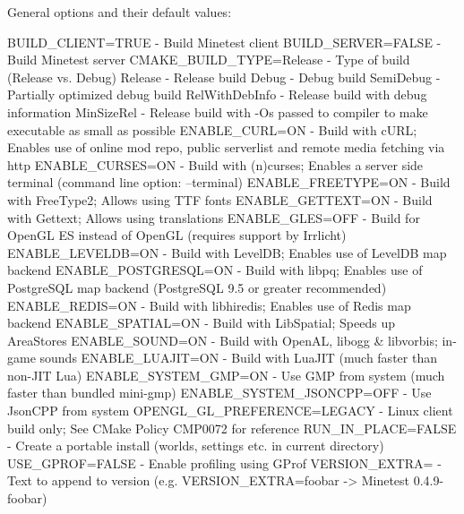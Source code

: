 General options and their default values\+: \begin{DoxyVerb}BUILD_CLIENT=TRUE          - Build Minetest client
BUILD_SERVER=FALSE         - Build Minetest server
CMAKE_BUILD_TYPE=Release   - Type of build (Release vs. Debug)
    Release                - Release build
    Debug                  - Debug build
    SemiDebug              - Partially optimized debug build
    RelWithDebInfo         - Release build with debug information
    MinSizeRel             - Release build with -Os passed to compiler to make executable as small as possible
ENABLE_CURL=ON             - Build with cURL; Enables use of online mod repo, public serverlist and remote media fetching via http
ENABLE_CURSES=ON           - Build with (n)curses; Enables a server side terminal (command line option: --terminal)
ENABLE_FREETYPE=ON         - Build with FreeType2; Allows using TTF fonts
ENABLE_GETTEXT=ON          - Build with Gettext; Allows using translations
ENABLE_GLES=OFF            - Build for OpenGL ES instead of OpenGL (requires support by Irrlicht)
ENABLE_LEVELDB=ON          - Build with LevelDB; Enables use of LevelDB map backend
ENABLE_POSTGRESQL=ON       - Build with libpq; Enables use of PostgreSQL map backend (PostgreSQL 9.5 or greater recommended)
ENABLE_REDIS=ON            - Build with libhiredis; Enables use of Redis map backend
ENABLE_SPATIAL=ON          - Build with LibSpatial; Speeds up AreaStores
ENABLE_SOUND=ON            - Build with OpenAL, libogg & libvorbis; in-game sounds
ENABLE_LUAJIT=ON           - Build with LuaJIT (much faster than non-JIT Lua)
ENABLE_SYSTEM_GMP=ON       - Use GMP from system (much faster than bundled mini-gmp)
ENABLE_SYSTEM_JSONCPP=OFF  - Use JsonCPP from system
OPENGL_GL_PREFERENCE=LEGACY - Linux client build only; See CMake Policy CMP0072 for reference
RUN_IN_PLACE=FALSE         - Create a portable install (worlds, settings etc. in current directory)
USE_GPROF=FALSE            - Enable profiling using GProf
VERSION_EXTRA=             - Text to append to version (e.g. VERSION_EXTRA=foobar -> Minetest 0.4.9-foobar)
\end{DoxyVerb}


